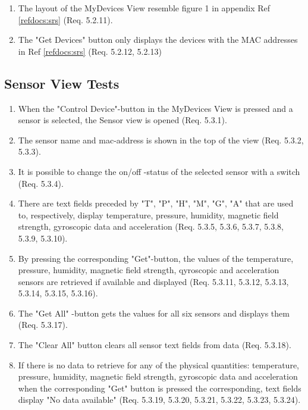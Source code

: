 \documentclass[a4paper]{article}
\newlength{\testlabellength}
\newenvironment{testlist}{\begin{enumerate}[label=\bfseries Test \thesubsection.\arabic* , labelindent=0pt, labelwidth=\testlabellength , leftmargin=2cm]}{\end{enumerate}}
\begin{document}
\begin{appendices}
\begin{testlist}
    \item The layout of the MyDevices View resemble figure 1 in appendix  Ref \ref{refdocs:srs} (Req. 5.2.11).
    
    \item The "Get Devices" button only displays the devices with the MAC addresses in Ref \ref{refdocs:srs} (Req. 5.2.12, 5.2.13)
\end{testlist}

\subsection{Sensor View Tests}
\begin{testlist}
\item When the "Control Device"-button in the MyDevices View is pressed and a sensor is selected, the Sensor view is opened (Req. 5.3.1).

\item The sensor name and mac-address is shown in the top of the view (Req. 5.3.2, 5.3.3).
 
\item It is possible to change the on/off -status of the selected sensor with a switch (Req. 5.3.4).

\item There are text fields preceded by "T", "P", "H", "M", "G", "A" that are used to, respectively, display temperature, pressure, humidity, magnetic field strength, gyroscopic data and acceleration (Req. 5.3.5, 5.3.6, 5.3.7, 5.3.8, 5.3.9, 5.3.10).

\item By pressing the corresponding "Get"-button, the values of the temperature, pressure, humidity, magnetic field strength, qyroscopic and acceleration sensors are retrieved if available and displayed (Req. 5.3.11, 5.3.12, 5.3.13, 5.3.14, 5.3.15, 5.3.16).

\item The "Get All" -button gets the values for all six sensors and displays them (Req. 5.3.17).

\item The "Clear All" button clears all sensor text fields from data (Req. 5.3.18).

\item If there is no data to retrieve for any of the physical quantities: temperature, pressure, humidity, magnetic field strength, gyroscopic data and acceleration when the corresponding "Get" button is pressed the corresponding, text fields display "No data available" (Req. 5.3.19, 5.3.20, 5.3.21, 5.3.22, 5.3.23, 5.3.24).


\end{testlist}
\end{appendices}
\end{document}
